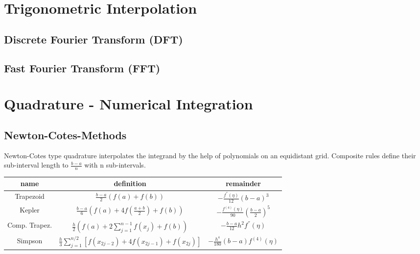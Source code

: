 \documentclass[
    a4paper,
    11pt
]{article}
\begin{document}
\section{Trigonometric Interpolation}

\subsection{Discrete Fourier Transform (DFT)}

\subsection{Fast Fourier Transform (FFT)}


\section{Quadrature - Numerical Integration}

\subsection{Newton-Cotes-Methods}

Newton-Cotes type quadrature interpolates the integrand by the help of
polynomials on an equidistant grid. Composite rules define their sub-interval
length to $\frac{b-a}{n}$ with n sub-intervals.


\begin{table}[H]
    \centering
    \begin{tabulary}{\linewidth}{C C C}
        \toprule
        name & definition & remainder\\
        \midrule
        Trapezoid &
            $\displaystyle \frac{b-a}{2} (f(a) + f(b)) $ &
            $\displaystyle -\frac{f^{''}(\eta)}{12}(b-a)^3$
        \\
        Kepler &
            $\displaystyle \frac{b-a}{6} \left( f(a) + 4f(\frac{a+b}{2}) + f(b)
            \right)$ &
            $\displaystyle - \frac{f^{(4)}(\eta)}{90} \left(\frac{b-a}{2}
            \right)^5$
        \\
        \midrule
        Comp. Trapez. &
            $\displaystyle \frac{h}{2} \left( f(a) + 2 \sum_{j=1}^{n-1}f(x_j) +
            f(b) \right) $ &
            $\displaystyle - \frac{b-a}{12} h^2 f^{''}(\eta)$
        \\
        Simpson &
            $\displaystyle \frac{h}{3} \sum_{j=1}^{n/2} \left[ f(x_{2j-2}) + 4
            f(x_{2j-1}) + f(x_{2j}) \right] $ &
            $\displaystyle - \frac{h^4}{180}(b-a) f^{(4)}(\eta)$
        \\

        \bottomrule

    \end{tabulary}
\end{table}
\end{document}
